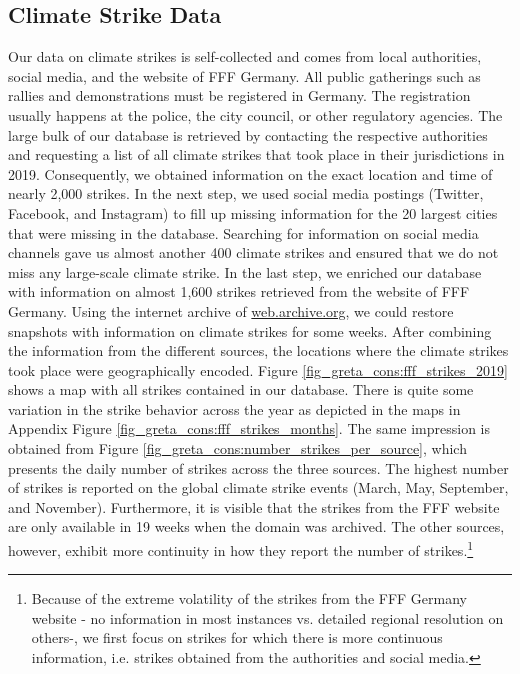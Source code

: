 \subsection{Climate Strike Data}
Our data on climate strikes is self-collected and comes from local authorities, social media, and the website of FFF Germany. All public gatherings such as rallies and demonstrations must be registered in Germany. The registration usually happens at the police, the city council, or other regulatory agencies. The large bulk of our database is retrieved by contacting the respective authorities and requesting a list of all climate strikes that took place in their jurisdictions in 2019. Consequently, we obtained information on the exact location and time of nearly 2,000 strikes. In the next step, we used social media postings (Twitter, Facebook, and Instagram) to fill up missing information for the 20 largest cities that were missing in the database. Searching for information on social media channels gave us almost another 400 climate strikes and ensured that we do not miss any large-scale climate strike. In the last step, we enriched our database with information on almost 1,600 strikes retrieved from the website of FFF Germany. Using the internet archive of \url{web.archive.org}, we could restore snapshots with information on climate strikes for some weeks. After combining the information from the different sources, the locations where the climate strikes took place were geographically encoded. Figure \ref{fig_greta_cons:fff_strikes_2019} shows a map with all strikes contained in our database. There is quite some variation in the strike behavior across the year as depicted in the maps in Appendix Figure \ref{fig_greta_cons:fff_strikes_months}. The same impression is obtained from Figure \ref{fig_greta_cons:number_strikes_per_source}, which presents the daily number of strikes across the three sources. The highest number of strikes is reported on the global climate strike events (March, May, September, and November). Furthermore, it is visible that the strikes from the FFF website are only available in 19 weeks when the domain was archived. The other sources, however, exhibit more continuity in how they report the number of strikes.\footnote{Because of the extreme volatility of the strikes from the FFF Germany website - no information in most instances vs. detailed regional resolution on others-, we first focus on strikes for which there is more continuous information, i.e. strikes obtained from the authorities and social media.} 



